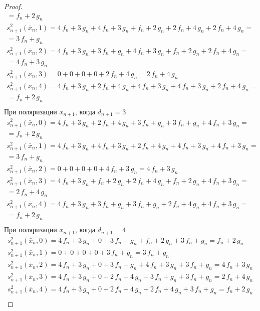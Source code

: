 \documentclass[bibliography=totoc, a4paper, 14pt]{extarticle}
\begin{document}
\begin{proof}
$$\begin{array}{l}
= f_n + 2\,g_n \\
s_{n+1}^2(\bar{x}_n, 1) = 4\,f_n + 3\,g_n + 4\,f_n + 3\,g_n + f_n + 2\,g_n + 2\,f_n + 4\,g_n + 2\,f_n + 4\,g_n =\\
= 3\,f_n + g_n \\
s_{n+1}^2(\bar{x}_n, 2) = 4\,f_n + 3\,g_n + 3\,f_n + g_n + 4\,f_n + 3\,g_n + f_n + 2\,g_n + 2\,f_n + 4\,g_n =\\
= 4\,f_n + 3\,g_n \\
s_{n+1}^2(\bar{x}_n, 3) = 0 + 0 + 0 + 0 + 2\,f_n + 4\,g_n = 2\,f_n + 4\,g_n \\
s_{n+1}^2(\bar{x}_n, 4) = 4\,f_n + 3\,g_n + 2\,f_n + 4\,g_n + 4\,f_n + 3\,g_n + 4\,f_n + 3\,g_n + 2\,f_n + 4\,g_n =\\
= f_n + 2\,g_n \\
\end{array}$$
При поляризации $x_{n+1}$, когда $d_{n+1} = 3$
$$\begin{array}{l}
s_{n+1}^2(\bar{x}_n, 0) = 4\,f_n + 3\,g_n + 2\,f_n + 4\,g_n + 3\,f_n + g_n + 3\,f_n + g_n + 4\,f_n + 3\,g_n =\\
= f_n + 2\,g_n \\
s_{n+1}^2(\bar{x}_n, 1) = 4\,f_n + 3\,g_n + 4\,f_n + 3\,g_n + 2\,f_n + 4\,g_n + 4\,f_n + 3\,g_n + 4\,f_n + 3\,g_n =\\
= 3\,f_n + g_n \\
s_{n+1}^2(\bar{x}_n, 2) = 0 + 0 + 0 + 0 + 4\,f_n + 3\,g_n = 4\,f_n + 3\,g_n \\
s_{n+1}^2(\bar{x}_n, 3) = 4\,f_n + 3\,g_n + f_n + 2\,g_n + 2\,f_n + 4\,g_n + f_n + 2\,g_n + 4\,f_n + 3\,g_n =\\
= 2\,f_n + 4\,g_n \\
s_{n+1}^2(\bar{x}_n, 4) = 4\,f_n + 3\,g_n + 3\,f_n + g_n + 3\,f_n + g_n + 2\,f_n + 4\,g_n + 4\,f_n + 3\,g_n =\\
= f_n + 2\,g_n \\
\end{array}$$
При поляризации $x_{n+1}$, когда $d_{n+1} = 4$
$$\begin{array}{l}
s_{n+1}^2(\bar{x}_n, 0) = 4\,f_n + 3\,g_n + 0 + 3\,f_n + g_n + f_n + 2\,g_n + 3\,f_n + g_n = f_n + 2\,g_n \\
s_{n+1}^2(\bar{x}_n, 1) = 0 + 0 + 0 + 0 + 3\,f_n + g_n = 3\,f_n + g_n \\
s_{n+1}^2(\bar{x}_n, 2) = 4\,f_n + 3\,g_n + 0 + 3\,f_n + g_n + 4\,f_n + 3\,g_n + 3\,f_n + g_n = 4\,f_n + 3\,g_n \\
s_{n+1}^2(\bar{x}_n, 3) = 4\,f_n + 3\,g_n + 0 + 2\,f_n + 4\,g_n + 3\,f_n + g_n + 3\,f_n + g_n = 2\,f_n + 4\,g_n \\
s_{n+1}^2(\bar{x}_n, 4) = 4\,f_n + 3\,g_n + 0 + 2\,f_n + 4\,g_n + 2\,f_n + 4\,g_n + 3\,f_n + g_n = f_n + 2\,g_n \\
\end{array}$$

\end{proof}
\end{document}
